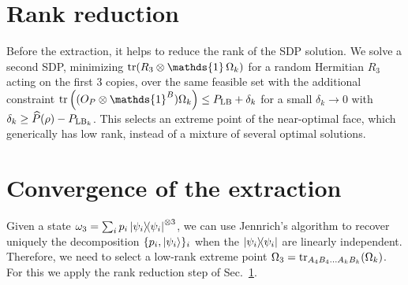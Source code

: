 \documentclass[11pt,a4paper]{report}
\newcommand{\ot}{\otimes}
\newcommand{\one}{\mathds{1}}
\newcommand{\I}{\one}
\newcounter{reptag}
\newif\iftags \tagsfalse   %
\newcommand{\reptagbox}[3]{\iftags\par\smallskip\noindent\refstepcounter{reptag}%
  \fcolorbox{#1}{#1!7}{\parbox{\dimexpr\linewidth-2\fboxsep-2\fboxrule\relax}{\small
  \textcolor{#1}{\textbf{[\thereptag]\ #2.}}\ #3}}\par\smallskip\fi}
\newcommand{\deeper}[1]{\reptagbox{tagP}{Deeper proof}{#1}}
\begin{document}
\deeper{State the continuity property that the convergence proof needs: the repaired value approaches the unrepaired one as $\sigma\to\rho$. This is clear when $\operatorname{supp}\sigma=\operatorname{supp}\rho$, but $\sigma^{-1/2}$ blows up on small eigenvalues of $\sigma$ outside $\operatorname{supp}\rho$, so check that case. Say what happens when $\operatorname{supp}\rho\not\subseteq\operatorname{supp}\sigma$ (too few terms).}

\section{Rank reduction}\label{sec:rankReduction}
Before the extraction, it helps to reduce the rank of the SDP solution. We solve a second SDP, minimizing $\tr(R_3 \ot \I \,\Omega_k)$ for a random Hermitian $R_3$ acting on the first $3$ copies, over the same feasible set with the additional constraint $\tr\left((O_P\otimes\I^B)\Omega_k\right)\leq P_{\rm LB}+\delta_k$ for a small $\delta_k\to0$ with $\delta_k \geq \widehat{P}(\rho)-P_{{\rm LB}_k}$. This selects an extreme point of the near-optimal face, which generically has low rank, instead of a mixture of several optimal solutions.
\deeper{The condition $\delta_k\ge\widehat P(\rho)-P_{{\rm LB}_k}$ involves the unknown convex roof. Say how $\delta_k$ is chosen in practice (e.g.\ from the gap to an upper bound, which guarantees it), mention that the objective had to be normalised for QICS to converge, and justify ``an extreme point generically has low rank'' (cite or sketch the rank bound for extreme points of spectrahedra).}

\section{Convergence of the extraction}\label{app:extractionConv}
Given a state $\omega_3 = \sum_i p_i \dyad{\psi_i}^{\otimes 3}$, we can use Jennrich's algorithm to recover uniquely the decomposition $\{p_i, \ket{\psi_i}\}_i$ when the $\dyad{\psi_i}$ are linearly independent. Therefore, we need to select a low-rank extreme point $\Omega_3 = \tr_{A_4B_4\dots A_kB_k}(\Omega_k)$. For this we apply the rank reduction step of Sec.~\ref{sec:rankReduction}.
\end{document}
